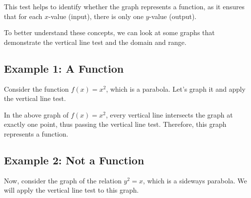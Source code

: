 This test helps to identify whether the graph represents a function, as it ensures that for each \( x \)-value (input), there is only one \( y \)-value (output).


To better understand these concepts, we can look at some graphs that demonstrate the vertical line test and the domain and range.

\subsection*{Example 1: A Function}

Consider the function \( f(x) = x^2 \), which is a parabola. Let's graph it and apply the vertical line test.

\begin{center}
\end{center}

In the above graph of \( f(x) = x^2 \), every vertical line intersects the graph at exactly one point, thus passing the vertical line test. Therefore, this graph represents a function.

\subsection*{Example 2: Not a Function}

Now, consider the graph of the relation \( y^2 = x \), which is a sideways parabola. We will apply the vertical line test to this graph.

\begin{center}
\end{center}

